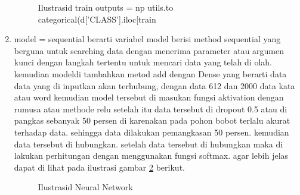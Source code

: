 \begin{enumerate}
\begin{figure}[!htbp]
      \caption{Ilustrasid train outputs = np utils.to categorical(d['CLASS'].iloc[train}
      \label{c138}
      \end{figure}

\item model = sequential berarti variabel model berisi method sequential yang berguna untuk searching data dengan menerima parameter atau argumen kunci dengan langkah tertentu untuk mencari data yang telah di olah. kemudian modeldi tambahkan metod add dengan Dense yang berarti data data yang di inputkan akan terhubung, dengan data 612 dan 2000 data  kata atau word kemudian model tersebut di masukan fungsi aktivation dengan rumusa atau methode relu setelah itu data tersebut di dropout 0.5 atau di pangkas sebanyak 50 persen di karenakan pada pohon bobot terlalu akurat terhadap data. sehingga data dilakukan pemangkasan 50 persen. kemudian data tersebut di hubungkan. setelah data tersebut di hubungkan maka di lakukan perhitungan dengan menggunakan fungsi softmax. agar lebih jelas dapat di lihat pada ilustrasi gambar \ref{c139} berikut.

\begin{figure}[!htbp]
      \caption{Ilustrasid Neural Network}
      \label{c139}
      \end{figure}


\end{enumerate}
